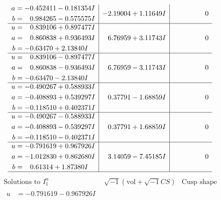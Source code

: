\documentclass[1p]{elsarticle_modified}
\theoremstyle{definition}
\newcommand{\I}{\sqrt{-1}}
\begin{document}
$$\begin{array}{c|c|c}
\begin{aligned}
a &= -0.452411 - 0.181354 I \\
b &= \phantom{-}0.984265 - 0.575575 I\end{aligned}
 & -2.19004 + 1.11649 I & \phantom{-0.000000 } 0 \\ \hline\begin{aligned}
u &= \phantom{-}0.839106 + 0.897477 I \\
a &= \phantom{-}0.860838 + 0.936493 I \\
b &= -0.63470 + 2.13840 I\end{aligned}
 & \phantom{-}6.76959 + 3.11743 I & \phantom{-0.000000 } 0 \\ \hline\begin{aligned}
u &= \phantom{-}0.839106 - 0.897477 I \\
a &= \phantom{-}0.860838 - 0.936493 I \\
b &= -0.63470 - 2.13840 I\end{aligned}
 & \phantom{-}6.76959 - 3.11743 I & \phantom{-0.000000 } 0 \\ \hline\begin{aligned}
u &= -0.490267 + 0.588933 I \\
a &= -0.408893 + 0.539297 I \\
b &= -0.118510 + 0.402371 I\end{aligned}
 & \phantom{-}0.37791 - 1.68859 I & \phantom{-0.000000 } 0 \\ \hline\begin{aligned}
u &= -0.490267 - 0.588933 I \\
a &= -0.408893 - 0.539297 I \\
b &= -0.118510 - 0.402371 I\end{aligned}
 & \phantom{-}0.37791 + 1.68859 I & \phantom{-0.000000 } 0 \\ \hline\begin{aligned}
u &= -0.791619 + 0.967926 I \\
a &= -1.012830 + 0.862680 I \\
b &= \phantom{-}0.61314 + 1.87380 I\end{aligned}
 & \phantom{-}3.14059 - 7.45185 I & \phantom{-0.000000 } 0\\
 \hline 
 \end{array}$$\newpage$$\begin{array}{c|c|c}  
\text{Solutions to }I^u_{1}& \I (\text{vol} + \sqrt{-1}CS) & \text{Cusp shape}\\
 \hline 
\begin{aligned}
u &= -0.791619 - 0.967926 I \\

\end{aligned}
\end{array}$$
\end{document}
